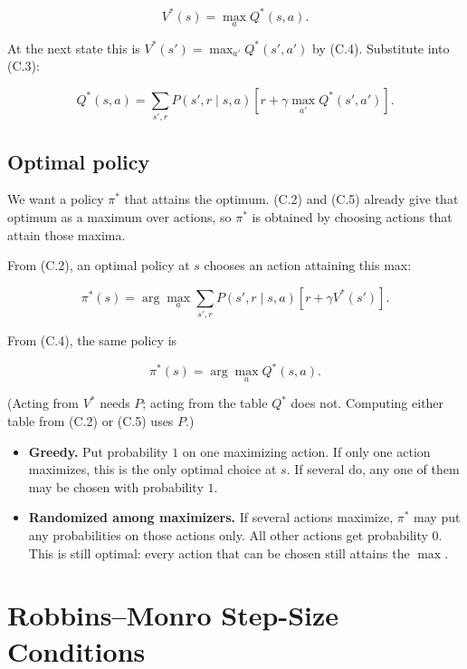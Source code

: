 \begin{equation}
V^*(s) = \max_a Q^*(s,a).
\tag{C.4}
\end{equation}

At the next state this is $V^*(s')=\max_{a'} Q^*(s',a')$ by (C.4). Substitute into (C.3):

\begin{equation}
Q^*(s,a)
=
\sum_{s',r}
P(s',r \mid s,a)
\left[
r + \gamma \max_{a'} Q^*(s',a')
\right].
\tag{C.5}\label{eq:C.5}
\end{equation}

\section{Optimal policy}\label{app:C.4}

We want a policy $\pi^*$ that attains the optimum. (C.2) and (C.5) already give that optimum as a maximum over actions, so $\pi^*$ is obtained by choosing actions that attain those maxima.

From (C.2), an optimal policy at $s$ chooses an action attaining this max:

\begin{equation}
\pi^*(s)
=
\arg\max_a
\sum_{s',r}
P(s',r \mid s,a)
\left[
r + \gamma V^*(s')
\right].
\tag{C.6}
\end{equation}

From (C.4), the same policy is

\begin{equation}
\pi^*(s) = \arg\max_a Q^*(s,a).
\tag{C.7}
\end{equation}

(Acting from $V^*$ needs $P$; acting from the table $Q^*$ does not. Computing either table from (C.2) or (C.5) uses $P$.)

\begin{itemize}
\item \textbf{Greedy.} Put probability $1$ on one maximizing action. If only one action maximizes, this is the only optimal choice at $s$. If several do, any one of them may be chosen with probability $1$.
\item \textbf{Randomized among maximizers.} If several actions maximize, $\pi^*$ may put any probabilities on those actions only. All other actions get probability $0$. This is still optimal: every action that can be chosen still attains the $\max$.
\end{itemize}

\chapter{Robbins--Monro Step-Size Conditions}\label{app:D}

